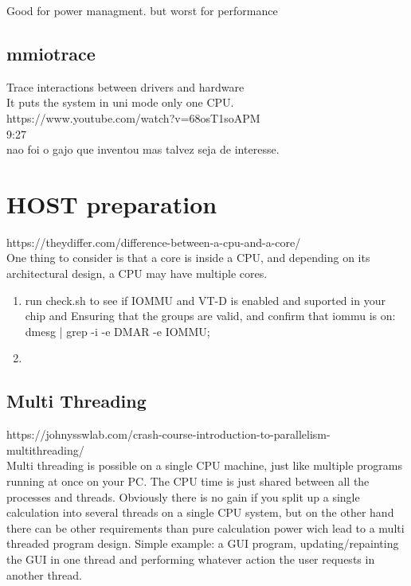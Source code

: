 \documentclass[11pt, a4paper, oneside]{article}
\theoremstyle{definition}
\begin{document}
Good for power managment. but worst for performance\\


\vfill
\pagebreak
\subsection{mmiotrace}

Trace interactions between drivers and hardware\\
It puts the system in uni mode only one CPU.\\

https://www.youtube.com/watch?v=68osT1soAPM\\
9:27\\
nao foi o gajo que inventou mas talvez seja de interesse.\\

\vfill
\pagebreak


\vfill
\pagebreak
\section{HOST preparation}
https://theydiffer.com/difference-between-a-cpu-and-a-core/\\
One thing to consider is that a core is inside a CPU, and depending on its architectural design, a CPU may have multiple cores.\\

\begin{enumerate}
	\item run check.sh to see if IOMMU and VT-D is enabled and suported in your chip and Ensuring that the groups are valid, and confirm that iommu is on: dmesg | grep -i -e DMAR -e IOMMU;
	\item 
\end{enumerate}
\subsection{Multi Threading}
https://johnysswlab.com/crash-course-introduction-to-parallelism-multithreading/\\
Multi threading is possible on a single CPU machine, just like multiple programs running at once on your PC. The CPU time is just shared between all the processes and threads. Obviously there is no gain if you split up a single calculation into several threads on a single CPU system, but on the other hand there can be other requirements than pure calculation power wich lead to a multi threaded program design. Simple example: a GUI program, updating/repainting the GUI in one thread and performing whatever action the user requests in another thread.\\
\end{document}
